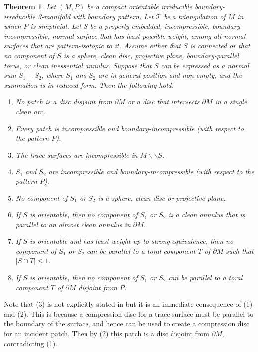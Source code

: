 \documentclass[oneside]{amsart}
\numberwithin{equation}{section}
\theoremstyle{plain}
\newtheorem{theorem}[equation]{Theorem}
\theoremstyle{definition}
\newcommand{\cut}{\backslash\backslash}
\begin{document}
\begin{theorem}
\label{Thm:SummandsEssentialEtc}
Let $(M,P)$ be a compact orientable irreducible boundary-irreducible 3-manifold with boundary pattern.
Let $\mathcal{T}$ be a triangulation of $M$ in which $P$ is simplicial. 
Let $S$ be a properly embedded, incompressible, boundary-incompressible, normal surface that has least possible weight,
among all normal surfaces that are pattern-isotopic to it. Assume either that $S$ is connected or that no component of $S$ is a sphere, clean disc, projective plane, boundary-parallel torus, or clean inessential annulus.
Suppose that $S$ can be expressed as a normal sum $S_1 + S_2$,
where $S_1$ and $S_2$ are in general position and non-empty, and the summation is in reduced form. Then the following hold.
\begin{enumerate}
\item No patch is a disc disjoint from $\partial M$ or a disc that intersects $\partial M$ in a single clean arc.
\item Every patch is incompressible and boundary-incompressible (with respect to the pattern $P$).
\item The trace surfaces are incompressible in $M \cut S$.
\item $S_1$ and $S_2$ are incompressible and boundary-incompressible (with respect to the pattern $P$).
\item No component of $S_1$ or $S_2$ is a sphere, clean disc or projective plane. 
\item If $S$ is orientable, then no component of $S_1$ or $S_2$ is a clean annulus that is parallel to an almost clean annulus in $\partial M$.
\item If $S$ is orientable and has least weight up to strong equivalence, then no component of $S_1$ or $S_2$ can be parallel to a toral component $T$ of $\partial M$
such that $|S \cap T| \leq 1$.
\item If $S$ is orientable, then no component of $S_1$ or $S_2$ can be parallel to a toral component $T$ of $\partial M$
disjoint from $P$.
\end{enumerate}
\end{theorem}

Note that (3) is not explicitly stated in \cite{Matveev} but it is an immediate consequence of (1) and (2). This is because a compression disc for a
trace surface must be parallel to the boundary of the surface, and hence can be used to create a compression disc
for an incident patch. Then by (2) this patch is a disc disjoint from $\partial M$, contradicting (1).
\end{document}
